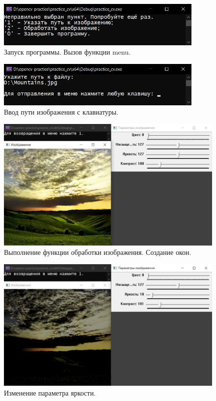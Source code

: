 \documentclass[12pt,a4paper]{scrartcl}
\begin{document}
\endgroup

\vfill
\newpage

\begin{figure}
 \centering
 \includegraphics[width=0.9\textwidth]{menu_func.png}
 \caption{Запуск программы. Вызов функции menu.}\label{fig:par}
\end{figure}

\begin{figure}
 \centering
 \includegraphics[width=0.9\textwidth]{image_get.png}
 \caption{Ввод пути изображения с клавиатуры.}\label{fig:par}
\end{figure}

\begin{figure}
 \centering
 \includegraphics[width=1\textwidth]{image_edit.png}
 \caption{Выполнение функции обработки изображения. Создание окон.}\label{fig:par}
\end{figure}

\begin{figure}
 \centering
 \includegraphics[width=1\textwidth]{image_edit_brightness.png}
 \caption{Изменение параметра яркости.}\label{fig:par}
\end{figure}
\end{document}
